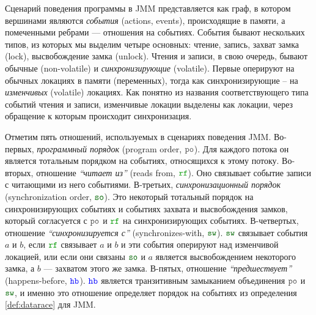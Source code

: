 Сценарий поведения программы в JMM представляется как граф, в котором вершинами
являются \emph{события} (actions, events), происходящие в памяти, а помеченными ребрами ---
отношения на событиях.
События бывают нескольких типов, из которых мы выделим четыре основных:
чтение, запись, захват замка (lock), высвобождение замка (unlock).
Чтения и записи, в свою очередь, бывают обычные (non-volatile) и \emph{синхронизирующие} (volatile).
Первые оперируют на обычных локациях в памяти (переменных), тогда как синхронизирующие -- на
\emph{изменчивых} (volatile) локациях.
Как понятно из названия соответствующего типа событий чтения и записи, изменчивые локации выделены как
локации, через обращение к которым происходит синхронизация.

Отметим пять отношений, используемых в сценариях поведения JMM.
Во-первых, \emph{программный порядок} (program order, $\lPO$).
Для каждого потока он является тотальным порядком на событиях, относящихся к этому потоку.
Во-вторых,  отношение \emph{``читает из''} (reads from, $\lRF$).
Оно связывает событие записи с читающими из него событиями.
В-третьих, \emph{синхронизационный порядок} (synchronization order, $\lSO$).
Это некоторый тотальный порядок на синхронизирующих событиях и событиях захвата и высвобождения замков,
который согласуется с $\lPO$ и $\lRF$ на синхронизирующих событиях.
В-четвертых, отношение \emph{``синхронизируется с''} (synchronizes-with, $\lSW$).
$\lSW$ связывает события $a$ и $b$, если $\lRF$ связывает $a$ и $b$ и эти события оперируют над изменчивой локацией,
или если они связаны $\lSO$ и $a$ является высвобождением некоторого замка, а $b$ --- захватом этого же замка.
В-пятых, отношение \emph{``предшествует''} (happens-before, $\lHB$).
$\lHB$ является транзитивным замыканием объединения $\lPO$ и $\lSW$, и именно это отношение определяет порядок
на событиях из определения \ref{def:datarace} для JMM.

